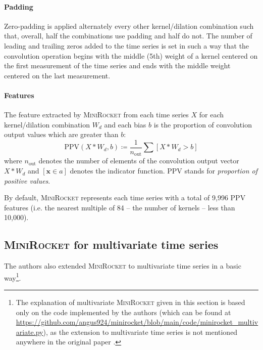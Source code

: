 \paragraph{Padding}
Zero-padding is applied alternately every other kernel/dilation combination such that, overall, half the combinations use padding and half do not. The number of leading and trailing zeros added to the time series is set in such a way that the convolution operation begins with the middle (5th) weight of a kernel centered on the first measurement of the time series and ends with the middle weight centered on the last measurement.


\paragraph{Features}
The feature extracted by \textsc{MiniRocket} from each time series $X$ for each kernel/dilation combination $W_d$ and each bias $b$ is the proportion of convolution output values which are greater than $b$:
\begin{equation}
\text{PPV}(X*W_d, b) \coloneqq \frac{1}{n_\text{out}} \sum\left[X*W_d > b\right]
\end{equation}
where $n_\text{out}$ denotes the number of elements of the convolution output vector $X*W_d$ and $[\mathbf{x}\in a]$ denotes the indicator function. PPV stands for \textit{proportion of positive values}.

By default, \textsc{MiniRocket} represents each time series with a total of 9,996 PPV features (i.e. the nearest multiple of 84 -- the number of kernels -- less than 10,000).


\subsection{\textsc{MiniRocket} for multivariate time series}
\label{sec:multivariate-minirocket}
The authors \cite{minirocket} also extended \textsc{MiniRocket} to multivariate time series in a basic way\footnote{The explanation of multivariate \textsc{MiniRocket} given in this section is based only on the code implemented by the authors (which can be found at \url{https://github.com/angus924/minirocket/blob/main/code/minirocket_multivariate.py}), as the extension to multivariate time series is not mentioned anywhere in the original paper \cite{minirocket}.}.

